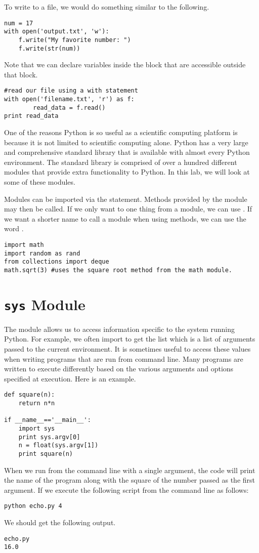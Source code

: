 To write to a file, we would do something similar to the following.
\begin{lstlisting}
num = 17
with open('output.txt', 'w'):
    f.write("My favorite number: ")
    f.write(str(num))
\end{lstlisting}

Note that we can declare variables inside the  block that are accessible outside that block.
\begin{lstlisting}
#read our file using a with statement
with open('filename.txt', 'r') as f:
        read_data = f.read()
print read_data
\end{lstlisting}

One of the reasons Python is so useful as a scientific computing platform is because it is not limited to scientific computing alone.
Python has a very large and comprehensive standard library that is available with almost every Python environment.
The standard library is comprised of over a hundred different modules that provide extra functionality to Python.
In this lab, we will look at some of these modules.

Modules can be imported via the  statement. Methods provided by the module may then be called.
If we only want to one thing from a module, we can use .
If we want a shorter name to call a module when using methods, we can use the word .
\begin{lstlisting}
import math
import random as rand
from collections import deque
math.sqrt(3) #uses the square root method from the math module.
\end{lstlisting}

\section*{\texttt{sys} Module}
The  module allows us to access information specific to the system running Python.
For example, we often import  to get the list  which is a list of arguments passed to the current environment.
It is sometimes useful to access these values when writing programs that are run from command line.
Many programs are written to execute differently based on the various arguments and options specified at execution.
Here is an example.
\begin{lstlisting}[title = echo.py]
def square(n):
    return n*n
        
if __name__=='__main__':
    import sys
    print sys.argv[0]
    n = float(sys.argv[1])
    print square(n)
\end{lstlisting}
When we run from the command line with a single argument, the code will print the name of the program along with the square of the number passed as the first argument.
If we execute the following script from the command line as follows:
\begin{lstlisting}[style=ShellInput]
python echo.py 4
\end{lstlisting}
We should get the following output.
\begin{lstlisting}[style=ShellOutput]
echo.py
16.0
\end{lstlisting}

